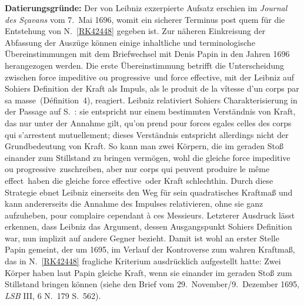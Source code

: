 %
%
\vspace{5mm}
\begin{ledgroup}
\footnotesize
\pstart
\noindent%
\textbf{Datierungsgründe:}
%
Der von Leibniz exzerpierte Aufsatz erschien im \textit{Journal des Sçavans} vom 7.\ Mai 1696, womit ein sicherer Terminus post quem für die Entstehung von N.~\ref{RK42448} gegeben ist.
%
Zur näheren Einkreisung der Abfassung der Auszüge können einige inhaltliche und terminologische Übereinstimmungen
%
mit dem Briefwechsel mit \protect{}Denis Papin in den Jahren 1696 herangezogen werden.
\pend
%
\pstart
Die erste Übereinstimmung betrifft die Unterscheidung zwischen \glqq force impeditive ou progressive\grqq\ und \glqq force effective\grqq,
%
mit der Leibniz auf \protect{}Sohiers Definition der Kraft als Impuls, als \glqq le produit de la vîtesse d'un corps par sa masse\grqq\ (Définition~4), reagiert.
%
Leibniz relativiert Sohiers Charakterisierung in der Passage auf S.~:
%
sie entspricht nur einem bestimmten Verständnis von \glqq Kraft\grqq, das nur unter der Annahme gilt,
%
\glqq qu'on prend pour forces egales celles des corps qui s'arrestent mutuellement\grqq;
%
dieses Verständnis entspricht allerdings nicht der  Grundbedeutung von Kraft.
%
So kann man zwei Körpern, die  im geraden Stoß einander zum Stillstand zu bringen vermögen, wohl die gleiche \glqq force impeditive ou progressive\grqq\ zuschreiben,
%
aber nur \glqq corps qui peuvent produire le même effect\grqq\ haben die gleiche \glqq force effective\grqq\ oder Kraft schlechthin.
%
Durch diese Strategie ebnet Leibniz einerseits den Weg für sein quadratisches Kraftmaß 
%
und kann andererseits die Annahme des Impulses relativieren, ohne sie ganz aufzuheben, \glqq pour complaire cependant à ces Messieurs\grqq.
%
Letzterer Ausdruck %
%
lässt erkennen, dass Leibniz das Argument, dessen Ausgangspunkt Sohiers Definition war, nun implizit auf andere Gegner bezieht.
%
Damit ist wohl an erster Stelle \protect{}Papin gemeint,
%
der um 1695, im Verlauf der Kontroverse zum wahren Kraftmaß,  das in N.~\ref{RK42448} fragliche Kriterium ausdrücklich aufgestellt hatte: 
%
Zwei Körper haben laut Papin gleiche Kraft, wenn sie einander im geraden Stoß zum Stillstand bringen können
%
(siehe den Brief vom 29.\ November/9.\ Dezember 1695, \textit{LSB} III, 6 \cite{02069}N.~179 S.~562).

\end{ledgroup}

